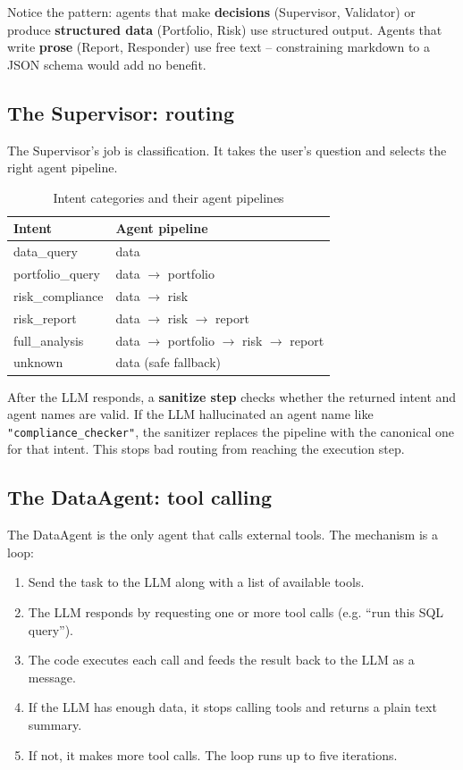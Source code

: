 \documentclass[12pt,a4paper]{article}
\begin{document}
Notice the pattern: agents that make \textbf{decisions} (Supervisor, Validator) or produce \textbf{structured data} (Portfolio, Risk) use structured output. Agents that write \textbf{prose} (Report, Responder) use free text -- constraining markdown to a JSON schema would add no benefit.

\subsection{The Supervisor: routing}

The Supervisor's job is classification. It takes the user's question and selects the right agent pipeline.

\begin{table}[H]
\centering
\small
\begin{tabular}{@{}p{3.5cm}p{9cm}@{}}
\toprule
\textbf{Intent} & \textbf{Agent pipeline} \\
\midrule
data\_query        & data \\
portfolio\_query   & data $\to$ portfolio \\
risk\_compliance   & data $\to$ risk \\
risk\_report       & data $\to$ risk $\to$ report \\
full\_analysis     & data $\to$ portfolio $\to$ risk $\to$ report \\
unknown            & data \quad (safe fallback) \\
\bottomrule
\end{tabular}
\caption{Intent categories and their agent pipelines}
\end{table}

After the LLM responds, a \textbf{sanitize step} checks whether the returned intent and agent names are valid. If the LLM hallucinated an agent name like \texttt{"compliance\_checker"}, the sanitizer replaces the pipeline with the canonical one for that intent. This stops bad routing from reaching the execution step.

\subsection{The DataAgent: tool calling}

The DataAgent is the only agent that calls external tools. The mechanism is a loop:

\begin{enumerate}
  \item Send the task to the LLM along with a list of available tools.
  \item The LLM responds by requesting one or more tool calls (e.g. ``run this SQL query'').
  \item The code executes each call and feeds the result back to the LLM as a message.
  \item If the LLM has enough data, it stops calling tools and returns a plain text summary.
  \item If not, it makes more tool calls. The loop runs up to five iterations.
\end{enumerate}
\end{document}
